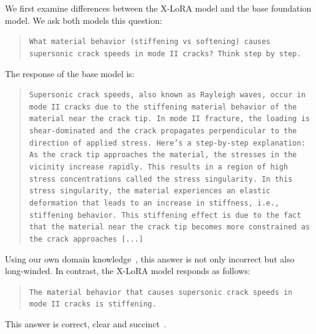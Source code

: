 \documentclass{article}
\begin{document}
We first examine differences between the X-LoRA model and the base foundation model. We ask both models this question:
\begin{quote}
\small\texttt{What material behavior (stiffening vs softening) causes supersonic crack speeds in mode II cracks? Think step by step.}
\end{quote}
%
The response of the base model is:
\begin{quote}
\small\texttt{Supersonic crack speeds, also known as Rayleigh waves, occur in mode II cracks due to the stiffening material behavior of the material near the crack tip. In mode II fracture, the loading is shear-dominated and the crack propagates perpendicular to the direction of applied stress.
Here's a step-by-step explanation:
\newline\newline
As the crack tip approaches the material, the stresses in the vicinity increase rapidly. This results in a region of high stress concentrations called the stress singularity.
\newline\newline
In this stress singularity, the material experiences an elastic deformation that leads to an increase in stiffness, i.e., stiffening behavior. This stiffening effect is due to the fact that the material near the crack tip becomes more constrained as the crack approaches [...]}
\end{quote}
Using our own domain knowledge~\cite{Buehler2008AtomisticFailure}, this answer is not only incorrect but also long-winded. In contrast, the X-LoRA model responds as follows:
\begin{quote}
\small\texttt{The material behavior that causes supersonic crack speeds in mode II cracks is stiffening.}
\end{quote}
This answer is correct, clear and succinct~\cite{Buehler2008AtomisticFailure}. 
\end{document}
